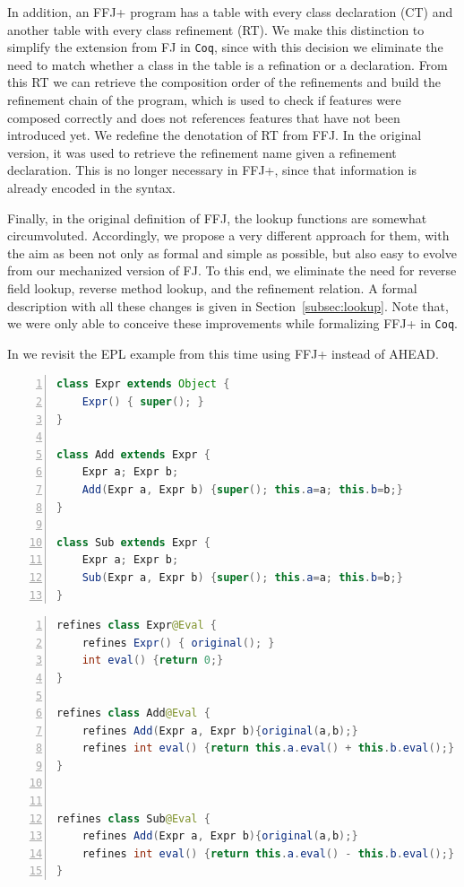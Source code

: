 In addition, an \gls{FFJ+} program has a table with every class 
declaration (\textsf{CT}) and another table with every class refinement (\textsf{RT}).
We make this distinction to simplify the extension from \gls{FJ} in \texttt{Coq}, since 
with this decision we eliminate the need to match whether a class in the table 
is a refination or a declaration. From this \textsf{RT} we can retrieve the composition order
of the refinements and build the refinement chain of the program, 
which is used to check if features were composed correctly and
does not references features that have not been introduced yet. 
We redefine the denotation of \textsf{RT} from \gls{FFJ}.
In the original version, it was used to retrieve the refinement name given a 
refinement declaration. This is no longer necessary in \gls{FFJ+}, since
that information is already encoded in the syntax.

Finally, in the original definition of \gls{FFJ}, the lookup functions are 
somewhat circumvoluted. Accordingly, we propose a very different approach
for them, with the aim as been not only as formal and simple as possible, 
but also easy to evolve from our mechanized version of \gls{FJ}. 
To this end, we eliminate the need for reverse field lookup, reverse method lookup, 
and the refinement relation. A formal description with all these changes 
is given in Section~\ref{subsec:lookup}. Note that, we were only 
able to conceive these improvements while formalizing \gls{FFJ+} in 
\texttt{Coq}. 

In  we revisit the EPL example from 
 this time using \gls{FFJ+} instead of AHEAD.

\begin{lstlisting}[language=Java, frame=single, numbers=left, basicstyle=\footnotesize,
    label={lst:expr-ct}, caption={EPL Class Table}]
class Expr extends Object {
    Expr() { super(); }
}

class Add extends Expr {
    Expr a; Expr b;
    Add(Expr a, Expr b) {super(); this.a=a; this.b=b;}
}

class Sub extends Expr {
    Expr a; Expr b;
    Sub(Expr a, Expr b) {super(); this.a=a; this.b=b;}
}
\end{lstlisting}

\begin{lstlisting}[language=Java, frame=single, numbers=left, basicstyle=\footnotesize,
    label={lst:expr-rt}, caption={EPL Refinement Table}]
refines class Expr@Eval {
    refines Expr() { original(); }
    int eval() {return 0;}
}

refines class Add@Eval {
    refines Add(Expr a, Expr b){original(a,b);}
    refines int eval() {return this.a.eval() + this.b.eval();}
}


refines class Sub@Eval {
    refines Add(Expr a, Expr b){original(a,b);}
    refines int eval() {return this.a.eval() - this.b.eval();}
}
\end{lstlisting}

